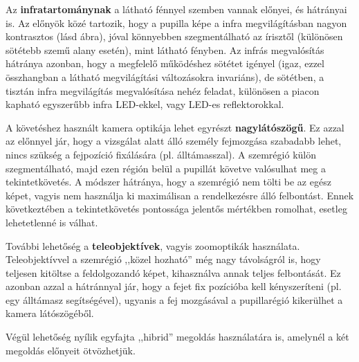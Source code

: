 Az \textbf{infratartománynak} a látható fénnyel szemben vannak előnyei, és hátrányai is. Az előnyök közé tartozik, hogy a pupilla képe a infra megvilágításban nagyon kontrasztos (lásd  ábra), jóval könnyebben szegmentálható az írisztől (különösen sötétebb szemű alany esetén), mint látható fényben. Az infrás megvalósítás hátránya azonban, hogy a megfelelő működéshez sötétet igényel (igaz, ezzel összhangban a látható megvilágítási változásokra invariáns), de sötétben, a tisztán infra megvilágítás megvalósítása nehéz feladat, különösen a piacon kapható egyszerűbb infra LED-ekkel, vagy LED-es reflektorokkal.

\bigskip

A követéshez használt kamera optikája lehet egyrészt \textbf{nagylátószögű}. Ez azzal az előnnyel jár, hogy a vizsgálat alatt álló személy fejmozgása szabadabb lehet, nincs szükség a fejpozíció fixálására (pl. álltámasszal). A szemrégió külön szegmentálható, majd ezen régión belül a pupillát követve valósulhat meg a tekintetkövetés. A módszer hátránya, hogy a szemrégió nem tölti be az egész képet, vagyis nem használja ki maximálisan a rendelkezésre álló felbontást. Ennek következtében a tekintetkövetés pontossága jelentős mértékben romolhat, esetleg lehetetlenné is válhat.

További lehetőség a \textbf{teleobjektívek}, vagyis zoomoptikák használata. Teleobjektívvel a szemrégió ,,közel hozható'' még nagy távolságról is, hogy teljesen kitöltse a feldolgozandó képet, kihasználva annak teljes felbontását. Ez azonban azzal a hátránnyal jár, hogy a fejet fix pozícióba kell kényszeríteni (pl. egy álltámasz segítségével), ugyanis a fej mozgásával a pupillarégió kikerülhet a kamera látószögéből.

Végül lehetőség nyílik egyfajta ,,hibrid'' megoldás használatára is, amelynél a két megoldás előnyeit ötvözhetjük.